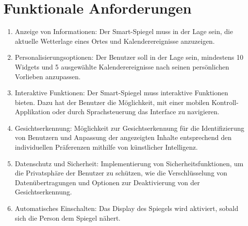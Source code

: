 \documentclass{article}
\begin{document}
\section{Funktionale Anforderungen}
\begin{enumerate}[label=\textbf{FA\arabic*:}]
    \item Anzeige von Informationen: Der Smart-Spiegel muss in der Lage sein, die aktuelle Wetterlage eines Ortes und Kalenderereignisse anzuzeigen.
    \item Personalisierungsoptionen: Der Benutzer soll in der Lage sein, mindestens 10 Widgets und  5 ausgewählte Kalenderereignisse nach seinen persönlichen Vorlieben anzupassen.
    \item Interaktive Funktionen: Der Smart-Spiegel muss interaktive Funktionen bieten. Dazu hat der Benutzer die Möglichkeit, mit einer mobilen Kontroll-Applikation oder durch Sprachsteuerung das Interface zu navigieren.
    \item Gesichtserkennung: Möglichkeit zur Gesichtserkennung für die Identifizierung von Benutzern und Anpassung der angezeigten Inhalte entsprechend den individuellen Präferenzen mithilfe von künstlicher Intelligenz.
    \item Datenschutz und Sicherheit: Implementierung von Sicherheitsfunktionen, um die Privatsphäre der Benutzer zu schützen, wie die Verschlüsselung von Datenübertragungen und Optionen zur Deaktivierung von der Gesichtserkennung.
    \item Automatisches Einschalten: Das Display des Spiegels wird aktiviert, sobald sich die Person dem Spiegel nähert.
\end{enumerate}
\end{document}
